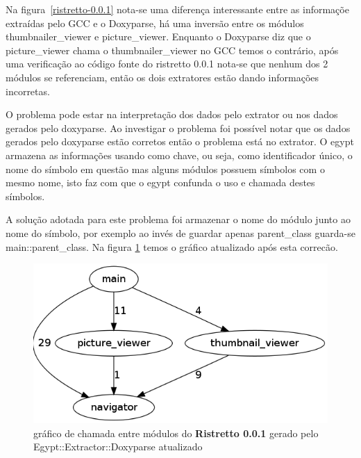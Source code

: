 Na figura~\ref{ristretto-0.0.1} nota-se uma diferença interessante entre as
informaçõe extraídas pelo GCC e o Doxyparse, há uma inversão entre os módulos
thumbnailer\_viewer e picture\_viewer. Enquanto o Doxyparse diz que o
picture\_viewer chama o thumbnailer\_viewer no GCC temos o contrário, após uma
verificação ao código fonte do ristretto 0.0.1 nota-se que nenhum dos 2 módulos
se referenciam, então os dois extratores estão dando informações incorretas.

O problema pode estar na interpretação dos dados pelo extrator ou nos dados
gerados pelo doxyparse. Ao investigar o problema foi possível notar que os
dados gerados pelo doxyparse estão corretos então o problema está no extrator. O
egypt armazena as informações usando como chave, ou seja, como identificador
único, o nome do símbolo em questão mas alguns módulos possuem símbolos com o
mesmo nome, isto faz com que o egypt confunda o uso e chamada destes símbolos.

A solução adotada para este problema foi armazenar o nome do módulo junto ao
nome do símbolo, por exemplo ao invés de guardar apenas parent\_class guarda-se
main::parent\_class. Na figura \ref{ristretto-0.0.1-doxyparse-2} temos o
gráfico atualizado após esta correcão.

\begin{figure}[h]
\center
\includegraphics[scale=0.3]{imagens/ristretto-0_0_1-doxyparse-2}
\caption{gráfico de chamada entre módulos do {\bf Ristretto 0.0.1} gerado pelo Egypt::Extractor::Doxyparse atualizado}
\label{ristretto-0.0.1-doxyparse-2}
\end{figure}

